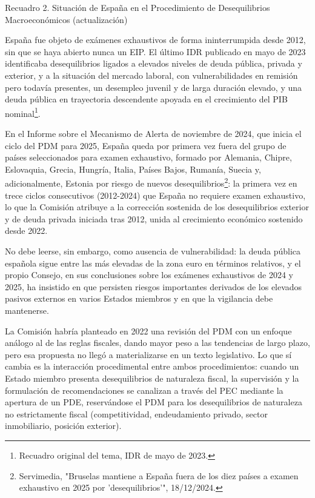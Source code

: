 \documentclass[10pt,a4paper]{article}
\begin{document}
Recuadro 2. Situación de España en el Procedimiento de Desequilibrios Macroeconómicos (actualización)

España fue objeto de exámenes exhaustivos de forma ininterrumpida desde 2012, sin que se haya abierto nunca un EIP. El último IDR publicado en mayo de 2023 identificaba desequilibrios ligados a elevados niveles de deuda pública, privada y exterior, y a la situación del mercado laboral, con vulnerabilidades en remisión pero todavía presentes, un desempleo juvenil y de larga duración elevado, y una deuda pública en trayectoria descendente apoyada en el crecimiento del PIB nominal\footnote{Recuadro original del tema, IDR de mayo de 2023.}.

En el Informe sobre el Mecanismo de Alerta de noviembre de 2024, que inicia el ciclo del PDM para 2025, España queda por primera vez fuera del grupo de países seleccionados para examen exhaustivo, formado por Alemania, Chipre, Eslovaquia, Grecia, Hungría, Italia, Países Bajos, Rumanía, Suecia y, adicionalmente, Estonia por riesgo de nuevos desequilibrios\footnote{%
    Servimedia, "Bruselas mantiene a España fuera de los diez países a examen exhaustivo en 2025 por 'desequilibrios'", 18/12/2024.
}: la primera vez en trece ciclos consecutivos (2012-2024) que España no requiere examen exhaustivo, lo que la Comisión atribuye a la corrección sostenida de los desequilibrios exterior y de deuda privada iniciada tras 2012, unida al crecimiento económico sostenido desde 2022. 

No debe leerse, sin embargo, como ausencia de vulnerabilidad: la deuda pública española sigue entre las más elevadas de la zona euro en términos relativos, y el propio Consejo, en sus conclusiones sobre los exámenes exhaustivos de 2024 y 2025, ha insistido en que persisten riesgos importantes derivados de los elevados pasivos externos en varios Estados miembros y en que la vigilancia debe mantenerse.

La Comisión habría planteado en 2022 una revisión del PDM con un enfoque análogo al de las reglas fiscales, dando mayor peso a las tendencias de largo plazo, pero esa propuesta no llegó a materializarse en un texto legislativo. Lo que sí cambia es la interacción procedimental entre ambos procedimientos: cuando un Estado miembro presenta desequilibrios de naturaleza fiscal, la supervisión y la formulación de recomendaciones se canalizan a través del PEC mediante la apertura de un PDE, reservándose el PDM para los desequilibrios de naturaleza no estrictamente fiscal (competitividad, endeudamiento privado, sector inmobiliario, posición exterior).
\end{document}
